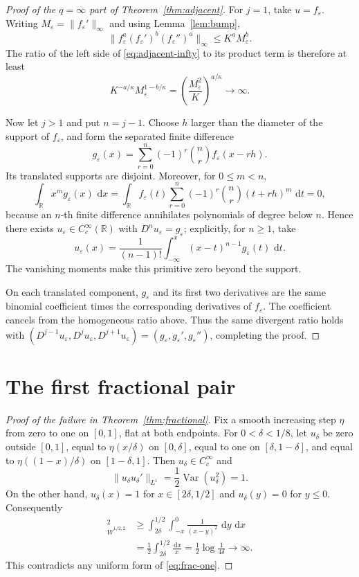 \documentclass[11pt]{article}
\newcommand{\R}{\mathbb R}
\newcommand{\dd}{\,\mathrm d}
\begin{document}
\begin{proof}[Proof of the $q=\infty$ part of Theorem~\ref{thm:adjacent}]
For $j=1$, take $u=f_\varepsilon$.  Writing
$M_\varepsilon=\|f_\varepsilon'\|_\infty$ and using
Lemma~\ref{lem:bump},
\[
 \|f_\varepsilon^a(f_\varepsilon')^b(f_\varepsilon'')^a\|_\infty
 \le K^aM_\varepsilon^b.
\]
The ratio of the left side of \eqref{eq:adjacent-infty} to its product term
is therefore at least
\[
 K^{-a/\kappa}M_\varepsilon^{1-b/\kappa}
 =\left(\frac{M_\varepsilon^2}{K}\right)^{a/\kappa}\longrightarrow\infty.
\]

Now let $j>1$ and put $n=j-1$.  Choose $h$ larger than the diameter of the
support of $f_\varepsilon$, and form the separated finite difference
\[
 g_\varepsilon(x)=\sum_{r=0}^n(-1)^r\binom nr
 f_\varepsilon(x-rh).
\]
Its translated supports are disjoint.  Moreover, for $0\le m<n$,
\[
 \int_\R x^m g_\varepsilon(x)\,\dd x
 =\int_\R f_\varepsilon(t)
   \sum_{r=0}^n(-1)^r\binom nr(t+rh)^m\,\dd t=0,
\]
because an $n$-th finite difference annihilates polynomials of degree below
$n$.  Hence there exists $u_\varepsilon\in C_c^\infty(\R)$ with
$D^n u_\varepsilon=g_\varepsilon$; explicitly, for $n\ge1$, take
\[
 u_\varepsilon(x)=\frac1{(n-1)!}
 \int_{-\infty}^x(x-t)^{n-1}g_\varepsilon(t)\,\dd t.
\]
The vanishing moments make this primitive zero beyond the support.

On each translated component, $g_\varepsilon$ and its first two derivatives
are the same binomial coefficient times the corresponding derivatives of
$f_\varepsilon$.  The coefficient cancels from the homogeneous ratio above.
Thus the same divergent ratio holds with
$(D^{j-1}u_\varepsilon,D^ju_\varepsilon,D^{j+1}u_\varepsilon)
=(g_\varepsilon,g_\varepsilon',g_\varepsilon'')$, completing the proof.
\end{proof}

\section{The first fractional pair}

\begin{proof}[Proof of the failure in Theorem~\ref{thm:fractional}]
Fix a smooth increasing step $\eta$ from zero to one on $[0,1]$, flat at
both endpoints.  For $0<\delta<1/8$, let $u_\delta$ be zero outside $[0,1]$,
equal to $\eta(x/\delta)$ on $[0,\delta]$, equal to one on
$[\delta,1-\delta]$, and equal to
$\eta((1-x)/\delta)$ on $[1-\delta,1]$.  Then $u_\delta\in C_c^\infty$ and
\[
 \|u_\delta u_\delta'\|_{L^1}
 =\frac12\operatorname{Var}(u_\delta^2)=1.
\]
On the other hand, $u_\delta(x)=1$ for $x\in[2\delta,1/2]$ and
$u_\delta(y)=0$ for $y\le0$.  Consequently
\begin{align*}
 [u_\delta]_{\dot W^{1/2,2}}^2
 &\ge \int_{2\delta}^{1/2}\int_{-x}^{0}
       \frac{1}{(x-y)^2}\,\dd y\,\dd x \\
 &=\frac12\int_{2\delta}^{1/2}\frac{\dd x}{x}
 =\frac12\log\frac1{4\delta}\longrightarrow\infty.
\end{align*}
This contradicts any uniform form of \eqref{eq:frac-one}.
\end{proof}
\end{document}
